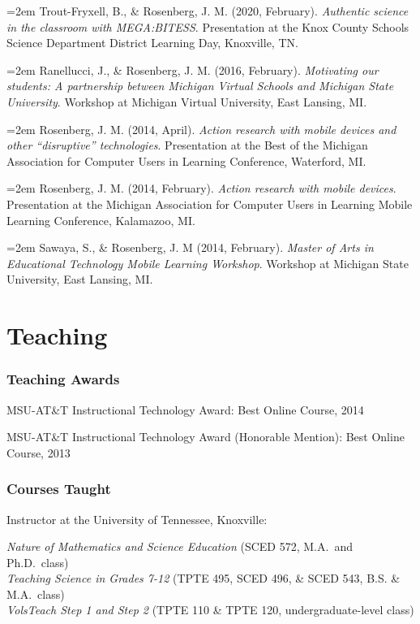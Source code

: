 \documentclass[
  11pt,
]{article}
\begin{document}
\hangindent=2em Trout-Fryxell, B., \& Rosenberg, J. M. (2020, February).
\emph{Authentic science in the classroom with MEGA:BITESS}. Presentation
at the Knox County Schools Science Department District Learning Day,
Knoxville, TN.

\hangindent=2em Ranellucci, J., \& Rosenberg, J. M. (2016, February).
\emph{Motivating our students: A partnership between Michigan Virtual
Schools and Michigan State University}. Workshop at Michigan Virtual
University, East Lansing, MI.

\hangindent=2em Rosenberg, J. M. (2014, April). \emph{Action research
with mobile devices and other ``disruptive'' technologies}. Presentation
at the Best of the Michigan Association for Computer Users in Learning
Conference, Waterford, MI.

\hangindent=2em Rosenberg, J. M. (2014, February). \emph{Action research
with mobile devices}. Presentation at the Michigan Association for
Computer Users in Learning Mobile Learning Conference, Kalamazoo, MI.

\hangindent=2em Sawaya, S., \& Rosenberg, J. M (2014, February).
\emph{Master of Arts in Educational Technology Mobile Learning
Workshop}. Workshop at Michigan State University, East Lansing, MI.

\hypertarget{teaching}{%
\section{Teaching}\label{teaching}}

\hypertarget{teaching-awards}{%
\subsubsection{Teaching Awards}\label{teaching-awards}}

MSU-AT\&T Instructional Technology Award: Best Online Course, 2014

MSU-AT\&T Instructional Technology Award (Honorable Mention): Best
Online Course, 2013

\hypertarget{courses-taught}{%
\subsubsection{Courses Taught}\label{courses-taught}}

Instructor at the University of Tennessee, Knoxville:

\emph{Nature of Mathematics and Science Education} (SCED 572, M.A.~and
Ph.D.~class)\\
\emph{Teaching Science in Grades 7-12} (TPTE 495, SCED 496, \& SCED 543,
B.S. \& M.A.~class)\\
\emph{VolsTeach Step 1 and Step 2} (TPTE 110 \& TPTE 120,
undergraduate-level class)
\end{document}
